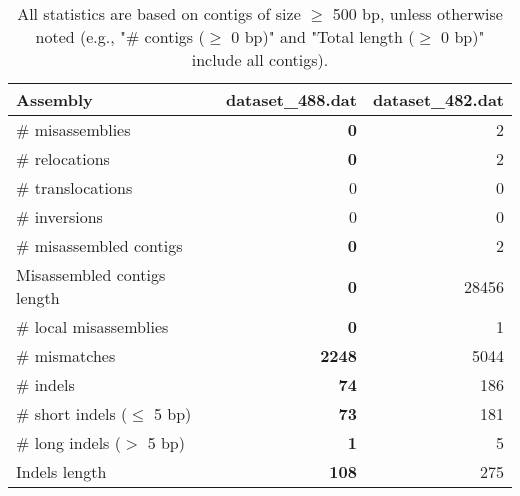 \documentclass[12pt,a4paper]{article}
\begin{document}
\begin{table}[ht]
\begin{center}
\caption{All statistics are based on contigs of size $\geq$ 500 bp, unless otherwise noted (e.g., "\# contigs ($\geq$ 0 bp)" and "Total length ($\geq$ 0 bp)" include all contigs).}
\begin{tabular}{|l*{2}{|r}|}
\hline
Assembly & dataset\_488.dat & dataset\_482.dat \\ \hline
\# misassemblies & {\bf 0} & 2 \\ \hline
\hspace{5mm}\# relocations & {\bf 0} & 2 \\ \hline
\hspace{5mm}\# translocations & 0 & 0 \\ \hline
\hspace{5mm}\# inversions & 0 & 0 \\ \hline
\# misassembled contigs & {\bf 0} & 2 \\ \hline
Misassembled contigs length & {\bf 0} & 28456 \\ \hline
\# local misassemblies & {\bf 0} & 1 \\ \hline
\# mismatches & {\bf 2248} & 5044 \\ \hline
\# indels & {\bf 74} & 186 \\ \hline
\hspace{5mm}\# short indels ($\leq$ 5 bp) & {\bf 73} & 181 \\ \hline
\hspace{5mm}\# long indels ($>$ 5 bp) & {\bf 1} & 5 \\ \hline
Indels length & {\bf 108} & 275 \\ \hline
\end{tabular}
\end{center}
\end{table}
\end{document}
